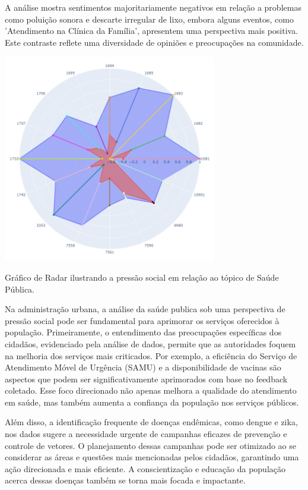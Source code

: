 A análise mostra sentimentos majoritariamente negativos em relação a problemas como poluição sonora e descarte irregular de lixo, embora alguns eventos, como 'Atendimento na Clínica da Família', apresentem uma perspectiva mais positiva. Este contraste reflete uma diversidade de opiniões e preocupações na comunidade.

\begin{quadro}[htb]
	\centering
	\includegraphics[width=0.7\textwidth]{images/social_barometer_public_health.png}
	\caption{Gráfico de Radar ilustrando a pressão social em relação ao tópico de Saúde Pública.}
	\label{fig:social_barometer_public_health}
\end{quadro}

Na administração urbana, a análise da saúde publica sob uma perspectiva de pressão social pode ser fundamental para aprimorar os serviços oferecidos à população. Primeiramente, o entendimento das preocupações específicas dos cidadãos, evidenciado pela análise de dados, permite que as autoridades foquem na melhoria dos serviços mais criticados. Por exemplo, a eficiência do Serviço de Atendimento Móvel de Urgência (SAMU) e a disponibilidade de vacinas são aspectos que podem ser significativamente aprimorados com base no feedback coletado. Esse foco direcionado não apenas melhora a qualidade do atendimento em saúde, mas também aumenta a confiança da população nos serviços públicos.

Além disso, a identificação frequente de doenças endêmicas, como dengue e zika, nos dados sugere a necessidade urgente de campanhas eficazes de prevenção e controle de vetores. O planejamento dessas campanhas pode ser otimizado ao se considerar as áreas e questões mais mencionadas pelos cidadãos, garantindo uma ação direcionada e mais eficiente. A conscientização e educação da população acerca dessas doenças também se torna mais focada e impactante.

